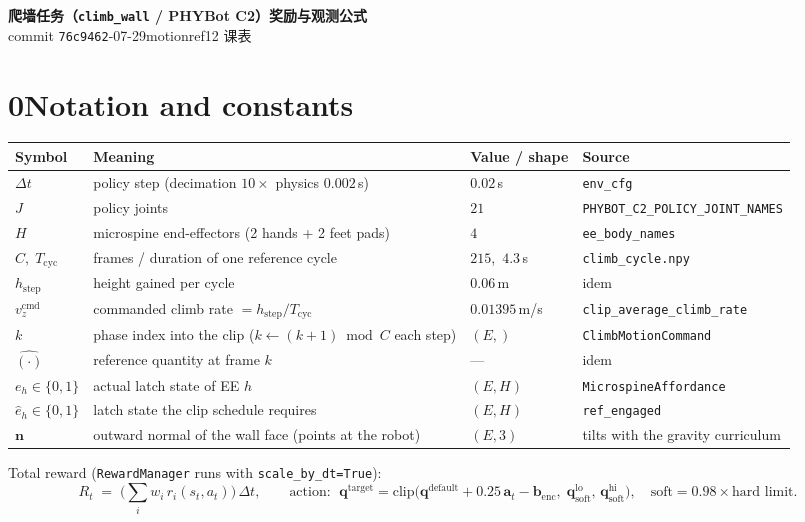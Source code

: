 \documentclass[11pt]{article}
\newcommand{\term}[1]{\texttt{\small #1}}
\begin{document}
\begin{center}
{\Large\bfseries 爬墙任务（\texttt{climb\_wall} / PHYBot C2）奖励与观测公式}\\[4pt]
{\normalsize commit \texttt{76c9462}-07-29\quad motionref12 课表}
\end{center}

\vspace{2pt}

\section*{0\quad Notation and constants}
\begin{center}
\begin{tabular}{@{}llll@{}}
\toprule
Symbol & Meaning & Value / shape & Source \\
\midrule
$\Delta t$ & policy step (decimation $10\times$ physics $0.002$\,s) & $0.02$\,s & \term{env\_cfg} \\
$J$ & policy joints & $21$ & \term{PHYBOT\_C2\_POLICY\_JOINT\_NAMES} \\
$H$ & microspine end-effectors (2 hands + 2 feet pads) & $4$ & \term{ee\_body\_names} \\
$C,\;T_{\mathrm{cyc}}$ & frames / duration of one reference cycle & $215$,\ $4.3$\,s & \term{climb\_cycle.npy} \\
$h_{\mathrm{step}}$ & height gained per cycle & $0.06$\,m & idem \\
$v_z^{\mathrm{cmd}}$ & commanded climb rate $=h_{\mathrm{step}}/T_{\mathrm{cyc}}$ & $0.01395$\,m/s & \term{clip\_average\_climb\_rate} \\
$k$ & phase index into the clip ($k\!\leftarrow\!(k{+}1)\bmod C$ each step) & $(E,)$ & \term{ClimbMotionCommand} \\
$\hat{(\cdot)}$ & reference quantity at frame $k$ & --- & idem \\
$e_h\in\{0,1\}$ & actual latch state of EE $h$ & $(E,H)$ & \term{MicrospineAffordance} \\
$\hat e_h\in\{0,1\}$ & latch state the clip schedule requires & $(E,H)$ & \term{ref\_engaged} \\
$\bm n$ & outward normal of the wall face (points at the robot) & $(E,3)$ & tilts with the gravity curriculum \\
\bottomrule
\end{tabular}
\end{center}

\vspace{4pt}
Total reward (\term{RewardManager} runs with \term{scale\_by\_dt=True}):
\[
R_t \;=\; \Big(\sum_i w_i\, r_i(s_t,a_t)\Big)\,\Delta t ,
\qquad
\text{action: }\;
\bm q^{\mathrm{target}}
=\mathrm{clip}\big(\bm q^{\mathrm{default}} + 0.25\,\bm a_t - \bm b_{\mathrm{enc}},\;
\bm q_{\mathrm{soft}}^{\mathrm{lo}},\,\bm q_{\mathrm{soft}}^{\mathrm{hi}}\big),
\quad \text{soft} = 0.98\times\text{hard limit}.
\]
\end{document}

